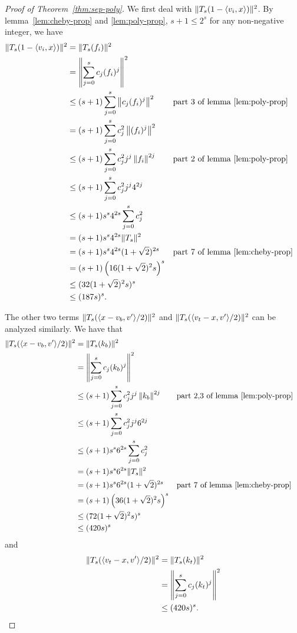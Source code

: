 \begin{proof}[Proof of Theorem~\ref{thm:sep-poly}]
We first deal with $\|T_s(1-\langle v_i,x\rangle)\|^2$.
By lemma~\ref{lem:cheby-prop} and \ref{lem:poly-prop}, $s+1\leq2^s$ for any non-negative integer, we have
\begin{align*}
    \|T_s(1-\langle v_i,x\rangle)\|^2 &= \|T_s(f_i)\|^2 \\
    &=\left\|\sum_{j=0}^s c_j(f_i)^j\right\|^2\\
    &\leq (s+1)\sum_{j=0}^s\left\| c_j(f_i)^j\right\|^2 & &\text{part 3 of lemma~\ref{lem:poly-prop}}\\
    &=(s+1)\sum_{j=0}^s c_j^2\left\|(f_i)^j\right\|^2 \\
    &\leq (s+1)\sum_{j=0}^s c_j^2j^j\left\|f_i\right\|^{2j} & &\text{part 2 of lemma~\ref{lem:poly-prop}}\\
    &\leq (s+1)\sum_{j=0}^s c_j^2j^j4^{2j}\\
    &\leq (s+1)s^s4^{2s}\sum_{j=0}^s c_j^2 \\
    &=(s+1)s^s4^{2s}\|T_s\|^2 \\
    &=(s+1)s^s4^{2s}(1+\sqrt{2})^{2s} & &\text{part 7 of lemma~\ref{lem:cheby-prop}}\\
    &=(s+1)\left(16(1+\sqrt{2})^2s\right)^s \\
    &\leq (32(1+\sqrt{2})^2s)^s \\
    &\leq (187s)^s.
\end{align*}

The other two terms $\|T_s(\langle x-v_b,v'\rangle/2)\|^2$ and $\|T_s(\langle v_t-x,v'\rangle/2)\|^2$ can be analyzed similarly.  We have that
\begin{align*}
    \|T_s(\langle x-v_b,v'\rangle/2)\|^2&=\|T_s(k_b)\|^2 \\
    &=\left\|\sum_{j=0}^s c_j(k_b)^j\right\|^2 \\
    &\leq (s+1)\sum_{j=0}^s c_j^2j^j\left\|k_b\right\|^{2j} & &\text{part 2,3 of lemma~\ref{lem:poly-prop}}\\
    &\leq (s+1)\sum_{j=0}^s c_j^2j^j6^{2j} \\
    &\leq (s+1)s^s6^{2s}\sum_{j=0}^s c_j^2 \\
    &=(s+1)s^s6^{2s}\|T_s\|^2 \\
    &=(s+1)s^s6^{2s}(1+\sqrt{2})^{2s} & &\text{part 7 of lemma~\ref{lem:cheby-prop}} \\
    &=(s+1)\left(36(1+\sqrt{2})^2s\right)^s \\
    &\leq (72(1+\sqrt{2})^2s)^s \\
    &\leq (420s)^s
\end{align*}
and
\begin{align*}
    \|T_s(\langle v_t-x,v'\rangle/2)\|^2 &= \|T_s(k_t)\|^2 \\
    &=\left\|\sum_{j=0}^s c_j(k_t)^j\right\|^2 \\
    &\leq (420s)^s.
\end{align*}


\end{proof}
